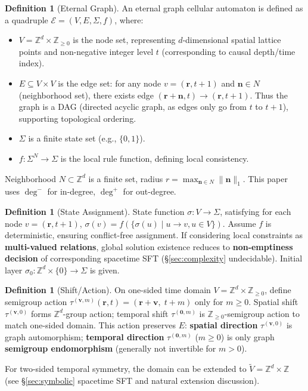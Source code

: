 \documentclass[11pt]{article}
\theoremstyle{definition}
\newtheorem{definition}[theorem]{Definition}
\theoremstyle{remark}
\begin{document}
\begin{definition}[Eternal Graph]\label{def:eternal}
An eternal graph cellular automaton is defined as a quadruple \( \mathcal{E} = (V, E, \Sigma, f) \), where:
\begin{itemize}
\item \( V = \mathbb{Z}^d \times \mathbb{Z}_{\ge0} \) is the node set, representing \( d \)-dimensional spatial lattice points and non-negative integer level \( t \) (corresponding to causal depth/time index).
\item \( E \subseteq V \times V \) is the edge set: for any node \( v = (\mathbf{r}, t+1) \) and \( \mathbf{n} \in N \) (neighborhood set), there exists edge \( (\mathbf{r} + \mathbf{n}, t) \to (\mathbf{r}, t+1) \). Thus the graph is a DAG (directed acyclic graph, as edges only go from \( t \) to \( t{+}1 \)), supporting topological ordering.
\item \( \Sigma \) is a finite state set (e.g., \( \{0,1\} \)).
\item \( f: \Sigma^{N} \to \Sigma \) is the local rule function, defining local consistency.
\end{itemize}

Neighborhood \( N \subset \mathbb{Z}^d \) is a finite set, radius \( r = \max_{\mathbf{n} \in N} \|\mathbf{n}\|_1 \). This paper uses \( \deg^- \) for in-degree, \( \deg^+ \) for out-degree.
\end{definition}

\begin{definition}[State Assignment]\label{def:state}
State function \( \sigma: V \to \Sigma \), satisfying for each node \( v = (\mathbf{r}, t+1) \), \( \sigma(v) = f(\{\sigma(u) \mid u \to v, u \in V\}) \). Assume \( f \) is deterministic, ensuring conflict-free assignment. If considering local constraints as \textbf{multi-valued relations}, global solution existence reduces to \textbf{non-emptiness decision} of corresponding spacetime SFT (§\ref{sec:complexity} undecidable). Initial layer \( \sigma_0: \mathbb{Z}^d \times \{0\} \to \Sigma \) is given.
\end{definition}

\begin{definition}[Shift/Action]\label{def:shift}
On one-sided time domain \( V=\mathbb{Z}^d\times\mathbb{Z}_{\ge0} \), define semigroup action \( \tau^{(\mathbf v,m)}(\mathbf r,t)=(\mathbf r+\mathbf v,\;t+m) \) only for \( m\ge0 \). Spatial shift \( \tau^{(\mathbf v,0)} \) forms \( \mathbb{Z}^d \)-group action; temporal shift \( \tau^{(\mathbf 0,m)} \) is \( \mathbb{Z}_{\ge0} \)-semigroup action to match one-sided domain. This action preserves \( E \): \textbf{spatial direction} \( \tau^{(\mathbf v,0)} \) is graph automorphism; \textbf{temporal direction} \( \tau^{(\mathbf 0,m)} \) (\( m\ge 0 \)) is only graph \textbf{semigroup endomorphism} (generally not invertible for \( m>0 \)).

For two-sided temporal symmetry, the domain can be extended to \( \tilde V=\mathbb{Z}^d\times\mathbb{Z} \) (see §\ref{sec:symbolic} spacetime SFT and natural extension discussion).
\end{definition}
\end{document}
